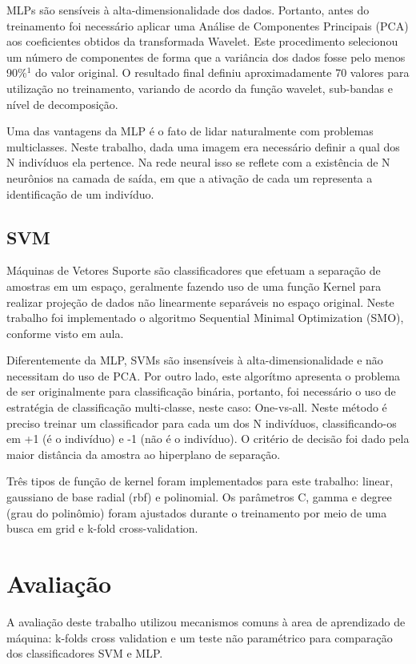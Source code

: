 \documentclass[conference]{IEEEtran}
\begin{document}
MLPs são sensíveis à alta-dimensionalidade dos dados. Portanto, antes do treinamento foi necessário aplicar uma Análise de Componentes Principais (PCA) aos coeficientes obtidos da transformada Wavelet. Este procedimento selecionou um número de componentes de forma que a variância dos dados fosse pelo menos 90\%$^1$ do valor original. O resultado final definiu aproximadamente 70 valores para utilização no treinamento, variando de acordo da função wavelet, sub-bandas e nível de decomposição.

Uma das vantagens da MLP é o fato de lidar naturalmente com problemas multiclasses. Neste trabalho, dada uma imagem era necessário definir a qual dos N indivíduos ela pertence. Na rede neural isso se reflete com a existência de N neurônios na camada de saída, em que a ativação de cada um representa a identificação de um indivíduo.


\subsection{SVM}
Máquinas de Vetores Suporte são classificadores que efetuam a separação de amostras em um espaço, geralmente fazendo uso de uma função Kernel para realizar projeção de dados não linearmente separáveis no espaço original. Neste trabalho foi implementado o algoritmo Sequential Minimal Optimization (SMO), conforme visto em aula. 

Diferentemente da MLP, SVMs são insensíveis à alta-dimensionalidade e não necessitam do uso de PCA. Por outro lado, este algorítmo apresenta o problema de ser originalmente para classificação binária, portanto, foi necessário o uso de estratégia de classificação multi-classe, neste caso: One-vs-all. Neste método é preciso treinar um classificador para cada um dos N indivíduos, classificando-os em +1 (é o indivíduo) e -1 (não é o indivíduo). O critério de decisão foi dado pela maior distância da amostra ao hiperplano de separação.

Três tipos de função de kernel foram implementados para este trabalho: linear, gaussiano de base radial (rbf) e polinomial. Os parâmetros C, gamma e degree (grau do polinômio) foram ajustados durante o treinamento por meio de uma busca em grid e k-fold cross-validation.

\section{Avaliação}
A avaliação deste trabalho utilizou mecanismos comuns à area de aprendizado de máquina: k-folds cross validation e um teste não paramétrico para comparação dos classificadores SVM e MLP.
\end{document}
